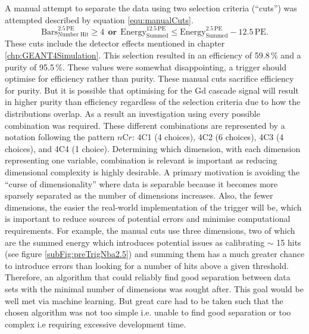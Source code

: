 A manual attempt to separate the data using two selection criteria (``cuts'') was attempted described by equation \ref{equ:manualCuts}. 
\begin{equation}
    \textrm{Bars}^{2.5\,\textrm{PE}}_\textrm{Number Hit} \geq 4 ~~\textbf{or}~~ \textrm{Energy}^{12.5\,\textrm{PE}}_\textrm{Summed} \leq \textrm{Energy}^{2.5\,\textrm{PE}}_\textrm{Summed} - 12.5\,\textrm{PE}. 
    \label{equ:manualCuts}
\end{equation}
These cuts include the detector effects mentioned in chapter \ref{chp:GEANT4Simulation}. This selection resulted in an efficiency of 59.8\,\% and a purity of 95.5\,\%. These values were somewhat disappointing, a trigger should optimise for efficiency rather than purity. These manual cuts sacrifice efficiency for purity. But it is possible that optimising for the Gd cascade signal will result in higher purity than efficiency regardless of the selection criteria due to how the distributions overlap. As a result an investigation using every possible combination was required. These different combinations are represented by a notation following the pattern $n$C$r$: 4C1 (4 choices), 4C2 (6 choices), 4C3 (4 choices), and 4C4 (1 choice). Determining which dimension, with each dimension representing one variable, combination is relevant is important as reducing dimensional complexity is highly desirable. A primary motivation is avoiding the ``curse of dimensionality'' \cite{taylor2019applications_cofD} where data is separable because it becomes more sparsely separated as the number of dimensions increases. Also, the fewer dimensions, the easier the real-world implementation of the trigger will be, which is important to reduce sources of potential errors and minimise computational requirements. For example, the manual cuts use three dimensions, two of which are the summed energy which introduces potential issues as calibrating $\sim$ 15 hits (see figure \ref{subFig:preTrigNba2.5}) and summing them has a much greater chance to introduce errors than looking for a number of hits above a given threshold. Therefore, an algorithm that could reliably find good separation between data sets with the minimal number of dimensions was sought after. This goal would be well met via machine learning. But great care had to be taken such that the chosen algorithm was not too simple i.e. unable to find good separation or too complex i.e requiring excessive development time. 
